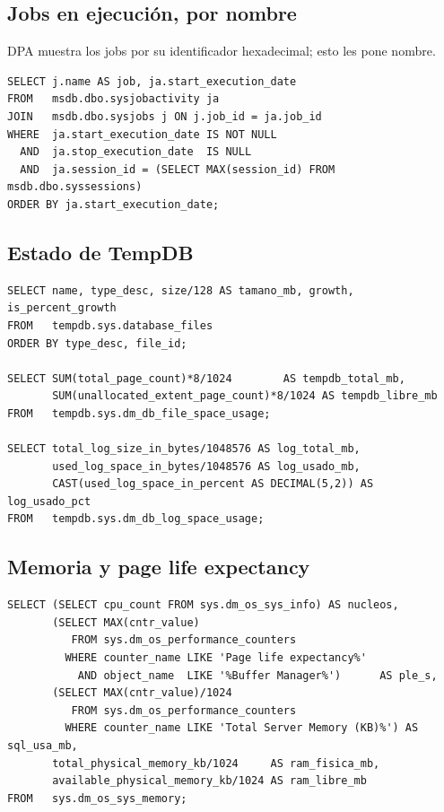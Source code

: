 \documentclass[11pt,a4paper]{article}
\begin{document}
\subsection{Jobs en ejecución, por nombre}

DPA muestra los jobs por su identificador hexadecimal; esto les pone nombre.

\begin{lstlisting}[style=sql]
SELECT j.name AS job, ja.start_execution_date
FROM   msdb.dbo.sysjobactivity ja
JOIN   msdb.dbo.sysjobs j ON j.job_id = ja.job_id
WHERE  ja.start_execution_date IS NOT NULL
  AND  ja.stop_execution_date  IS NULL
  AND  ja.session_id = (SELECT MAX(session_id) FROM msdb.dbo.syssessions)
ORDER BY ja.start_execution_date;
\end{lstlisting}

\subsection{Estado de TempDB}

\begin{lstlisting}[style=sql]
SELECT name, type_desc, size/128 AS tamano_mb, growth, is_percent_growth
FROM   tempdb.sys.database_files
ORDER BY type_desc, file_id;

SELECT SUM(total_page_count)*8/1024        AS tempdb_total_mb,
       SUM(unallocated_extent_page_count)*8/1024 AS tempdb_libre_mb
FROM   tempdb.sys.dm_db_file_space_usage;

SELECT total_log_size_in_bytes/1048576 AS log_total_mb,
       used_log_space_in_bytes/1048576 AS log_usado_mb,
       CAST(used_log_space_in_percent AS DECIMAL(5,2)) AS log_usado_pct
FROM   tempdb.sys.dm_db_log_space_usage;
\end{lstlisting}

\subsection{Memoria y page life expectancy}

\begin{lstlisting}[style=sql]
SELECT (SELECT cpu_count FROM sys.dm_os_sys_info) AS nucleos,
       (SELECT MAX(cntr_value)
          FROM sys.dm_os_performance_counters
         WHERE counter_name LIKE 'Page life expectancy%'
           AND object_name  LIKE '%Buffer Manager%')      AS ple_s,
       (SELECT MAX(cntr_value)/1024
          FROM sys.dm_os_performance_counters
         WHERE counter_name LIKE 'Total Server Memory (KB)%') AS sql_usa_mb,
       total_physical_memory_kb/1024     AS ram_fisica_mb,
       available_physical_memory_kb/1024 AS ram_libre_mb
FROM   sys.dm_os_sys_memory;
\end{lstlisting}
\end{document}
